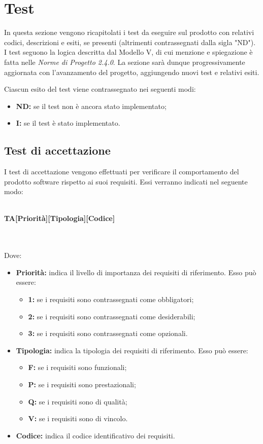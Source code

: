 \section{Test}
In questa sezione vengono ricapitolati i test da eseguire sul prodotto con relativi codici, descrizioni e esiti, se presenti (altrimenti contrassegnati dalla sigla "ND"). I test seguono la logica descritta dal Modello V, di cui menzione e spiegazione è fatta nelle \textit{Norme di Progetto 2.4.0\docs}. La sezione sarà dunque progressivamente aggiornata con l'avanzamento del progetto, aggiungendo nuovi test e relativi esiti.

Ciascun esito del test viene contrassegnato nei seguenti modi:
\begin{itemize}
	\item \textbf{ND:} se il test non è ancora stato implementato;
	\item \textbf{I:} se il test è stato implementato.
\end{itemize}

\subsection{Test di accettazione}
I test di accettazione vengono effettuati per verificare il comportamento del prodotto software rispetto ai suoi requisiti. Essi verranno indicati nel seguente modo:\\\\
\centerline{\textbf{TA[Priorità][Tipologia][Codice]}}\\\\
Dove:
\begin{itemize}
	\item \textbf{Priorità:} indica il livello di importanza dei requisiti di riferimento. Esso può essere:
	\begin{itemize}
		\item \textbf{1:} se i requisiti sono contrassegnati come obbligatori;
		\item \textbf{2:} se i requisiti sono contrassegnati come desiderabili;
		\item \textbf{3:} se i requisiti sono contrassegnati come opzionali.
	\end{itemize}
	\item \textbf{Tipologia:} indica la tipologia dei requisiti di riferimento. Esso può essere:
	\begin{itemize}
		\item \textbf{F:} se i requisiti sono funzionali;
		\item \textbf{P:} se i requisiti sono prestazionali;
		\item \textbf{Q:} se i requisiti sono di qualità;
		\item \textbf{V:} se i requisiti sono di vincolo.
	\end{itemize}
	\item \textbf{Codice:} indica il codice identificativo dei requisiti.
\end{itemize}

